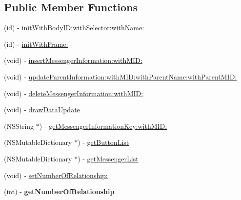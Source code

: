 \subsection*{Public Member Functions}
\begin{DoxyCompactItemize}
\item 
(id) -\/ \hyperlink{interface_messenger_view_controller_a44c0a2552e50d6223a8230447be3e83a}{initWithBodyID:withSelector:withName:}
\item 
(id) -\/ \hyperlink{interface_messenger_view_controller_a1ac23270dbc04a95b72dd16b2c201c5a}{initWithFrame:}
\item 
(void) -\/ \hyperlink{interface_messenger_view_controller_aa30151ef1d95034a10fa31e9c8a7da22}{insertMessengerInformation:withMID:}
\item 
(void) -\/ \hyperlink{interface_messenger_view_controller_a3eb404c4ef5fc51caae10e71136f35ff}{updateParentInformation:withMID:withParentName:withParentMID:}
\item 
(void) -\/ \hyperlink{interface_messenger_view_controller_ab9c9343a0f520cdc1aa91b3985b31f7a}{deleteMessengerInformation:withMID:}
\item 
(void) -\/ \hyperlink{interface_messenger_view_controller_aba89f37600bb5cc7258a034614257dc6}{drawDataUpdate}
\item 
(NSString $\ast$) -\/ \hyperlink{interface_messenger_view_controller_a9c958b9ee93a81551b3aa4209eaa3c71}{getMessengerInformationKey:withMID:}
\item 
(NSMutableDictionary $\ast$) -\/ \hyperlink{interface_messenger_view_controller_afa883d1d29e91d003087a0f4b839daf3}{getButtonList}
\item 
(NSMutableDictionary $\ast$) -\/ \hyperlink{interface_messenger_view_controller_a2e4617fc57087279158f9df78fab0a87}{getMessengerList}
\item 
(void) -\/ \hyperlink{interface_messenger_view_controller_aa75f66a06d37f03a7d2b51e9c7149051}{setNumberOfRelationship:}
\item 
\hypertarget{interface_messenger_view_controller_aa06b18307f500c793a8493da0969b57b}{
(int) -\/ {\bfseries getNumberOfRelationship}}
\label{interface_messenger_view_controller_aa06b18307f500c793a8493da0969b57b}


\end{DoxyCompactItemize}

